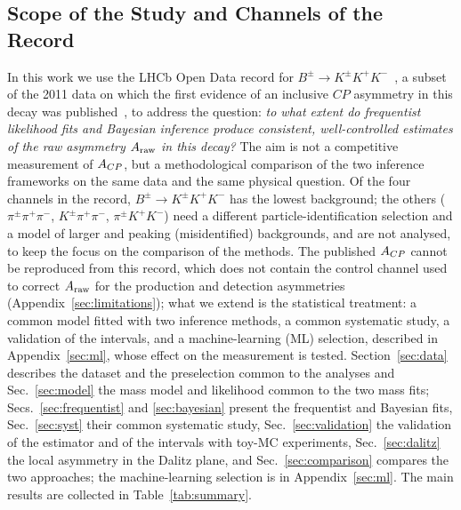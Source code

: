 \subsection{Scope of the Study and Channels of the Record}
In this work we use the LHCb Open Data record for $B^{\pm}\to K^{\pm}K^{+}K^{-}$~\cite{opendata_record,opendata_notebook}, a subset of the 2011 data on which the first evidence of an inclusive $CP$ asymmetry in this decay was published~\cite{lhcb_cpv_2013}, to address the question: \emph{to what extent do frequentist likelihood fits and Bayesian inference produce consistent, well-controlled estimates of the raw asymmetry $A_{\mathrm{raw}}$ in this decay?} The aim is not a competitive measurement of $A_{CP}$, but a methodological comparison of the two inference frameworks on the same data and the same physical question. Of the four channels in the record, $B^\pm\to K^\pm K^+K^-$ has the lowest background; the others ($\pi^\pm\pi^+\pi^-$, $K^\pm\pi^+\pi^-$, $\pi^\pm K^+K^-$) need a different particle-identification selection and a model of larger and peaking (misidentified) backgrounds, and are not analysed, to keep the focus on the comparison of the methods. The published $A_{CP}$ cannot be reproduced from this record, which does not contain the control channel used to correct $A_{\mathrm{raw}}$ for the production and detection asymmetries (Appendix~\ref{sec:limitations}); what we extend is the statistical treatment: a common model fitted with two inference methods, a common systematic study, a validation of the intervals, and a machine-learning (ML) selection, described in Appendix~\ref{sec:ml}, whose effect on the measurement is tested. Section~\ref{sec:data} describes the dataset and the preselection common to the analyses and Sec.~\ref{sec:model} the mass model and likelihood common to the two mass fits; Secs.~\ref{sec:frequentist} and \ref{sec:bayesian} present the frequentist and Bayesian fits, Sec.~\ref{sec:syst} their common systematic study, Sec.~\ref{sec:validation} the validation of the estimator and of the intervals with toy-MC experiments, Sec.~\ref{sec:dalitz} the local asymmetry in the Dalitz plane, and Sec.~\ref{sec:comparison} compares the two approaches; the machine-learning selection is in Appendix~\ref{sec:ml}. The main results are collected in Table~\ref{tab:summary}.

